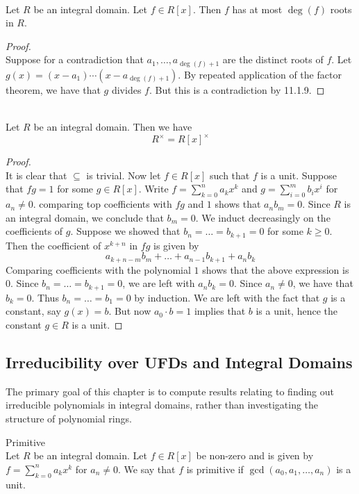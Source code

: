 \documentclass[a4paper]{article}
\begin{document}
\begin{prp}{}{}\\
Let $R$ be an integral domain. Let $f\in R[x]$. Then $f$ has at most $\deg(f)$ roots in $R$. 
\begin{proof}\\
Suppose for a contradiction that $a_1,\dots,a_{\deg(f)+1}$ are the distinct roots of $f$. Let $g(x)=(x-a_1)\cdots(x-a_{\deg(f)+1})$. By repeated application of the factor theorem, we have that $g$ divides $f$. But this is a contradiction by 11.1.9. 
\end{proof}
\end{prp}

\begin{prp}{}{}\\
Let $R$ be an integral domain. Then we have $$R^\times=R[x]^\times$$
\begin{proof}\\
It is clear that $\subseteq$ is trivial. Now let $f\in R[x]$ such that $f$ is a unit. Suppose that $fg=1$ for some $g\in R[x]$. Write $f=\sum_{k=0}^na_kx^k$ and $g=\sum_{i=0}^mb_ix^i$ for $a_n\neq 0$. comparing top coefficients with $fg$ and $1$ shows that $a_nb_m=0$. Since $R$ is an integral domain, we conclude that $b_m=0$. We induct decreasingly on the coefficients of $g$. Suppose we showed that $b_n=\dots=b_{k+1}=0$ for some $k\geq 0$. Then the coefficient of $x^{k+n}$ in $fg$ is given by $$a_{k+n-m}b_m+\dots+a_{n-1}b_{k+1}+a_nb_k$$ Comparing coefficients with the polynomial $1$ shows that the above expression is $0$. Since $b_n=\dots=b_{k+1}=0$, we are left with $a_nb_k=0$. Since $a_n\neq 0$, we have that $b_k=0$. Thus $b_n=\dots=b_1=0$ by induction. We are left with the fact that $g$ is a constant, say $g(x)=b$. But now $a_0\cdot b=1$ implies that $b$ is a unit, hence the constant $g\in R$ is a unit. 
\end{proof}
\end{prp}

\subsection{Irreducibility over UFDs and Integral Domains}
The primary goal of this chapter is to compute results relating to finding out irreducible polynomials in integral domains, rather than investigating the structure of polynomial rings. 

\begin{defn}{Primitive}{}\\
Let $R$ be an integral domain. Let $f\in R[x]$ be non-zero and is given by $f=\sum_{k=0}^na_kx^k$ for $a_n\neq 0$. We say that $f$ is primitive if $\gcd(a_0,a_1,\dots,a_n)$ is a unit. 
\end{defn}
\end{document}
